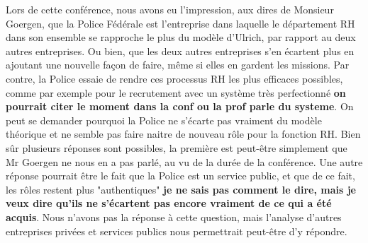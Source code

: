 Lors de cette conférence, nous avons eu l'impression, aux dires de Monsieur Goergen, que la Police Fédérale est l'entreprise dans laquelle le département RH dans son ensemble se rapproche le plus du modèle d'Ulrich, par rapport au deux autres entreprises. Ou bien, que les deux autres entreprises s'en écartent plus en ajoutant une nouvelle façon de faire, même si elles en gardent les missions. Par contre, la Police essaie de rendre ces processus RH les plus efficaces possibles, comme par exemple pour le recrutement avec un système très perfectionné \textbf{on pourrait citer le moment dans la conf ou la prof parle du systeme}. On peut se demander pourquoi la Police ne s'écarte pas vraiment du modèle théorique et ne semble pas faire naitre de nouveau rôle pour la fonction RH. Bien sûr plusieurs réponses sont possibles, la première est peut-être simplement que Mr Goergen ne nous en a pas parlé, au vu de la durée de la conférence. Une autre réponse pourrait être le fait que la Police est un service public, et que de ce fait, les rôles restent plus "authentiques" \textbf{je ne sais pas comment le dire, mais je veux dire qu'ils ne s'écartent pas encore vraiment de ce qui a été acquis}. Nous n'avons pas la réponse à cette question, mais l'analyse d'autres entreprises privées et services publics nous permettrait peut-être d'y répondre. \\






 
